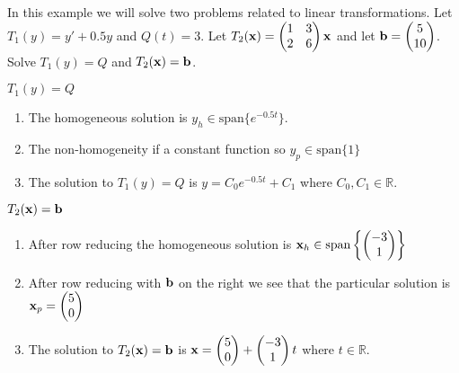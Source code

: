 \begin{example}
    In this example we will solve two problems related to linear transformations.
    Let $T_1(y) = y'+0.5y$ and $Q(t) = 3$.  Let $T_2({\bf x}) = \begin{pmatrix} 1 & 3 \\ 2 &
        6 \end{pmatrix} {\bf x}$ and let ${\bf b} = \begin{pmatrix} 5 \\ 10 \end{pmatrix}$.  Solve
            $T_1(y) = Q$ and $T_2({\bf x}) = {\bf b}$.

\begin{minipage}{0.45\columnwidth}
    {\bf $T_1(y) = Q$}
    \begin{enumerate}
        \item The homogeneous solution is $y_{h} \in \text{span}\{e^{-0.5t}\}$.
        \item The non-homogeneity if a constant function so $y_p \in \text{span}\{1\}$
        \item The solution to $T_1(y) = Q$ is $y = C_0 e^{-0.5t} + C_1$ where $C_0, C_1 \in
            \mathbb{R}$.
    \end{enumerate}
\end{minipage}
\begin{minipage}{0.45\columnwidth}
    {\bf $T_2({\bf x}) = {\bf b}$}
    \begin{enumerate}
        \item After row reducing the homogeneous solution is ${\bf x}_{h} \in
            \text{span}\left\{ \begin{pmatrix} -3 \\ 1
            \end{pmatrix} \right\}$
        \item After row reducing with ${\bf b}$ on the right we see that the particular
            solution is ${\bf x}_p = \begin{pmatrix} 5 \\ 0 \end{pmatrix}$
            \item The solution to $T_2({\bf x})={\bf b}$ is ${\bf x} = \begin{pmatrix} 5 \\
                    0\end{pmatrix} + \begin{pmatrix} -3 \\ 1 \end{pmatrix} t$ where $t \in
                        \mathbb{R}$.
    \end{enumerate}
\end{minipage}
\end{example}



